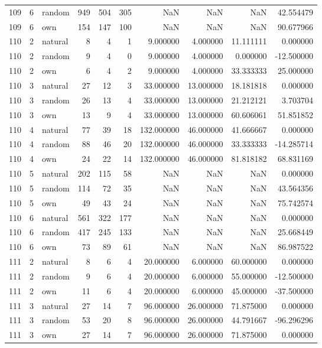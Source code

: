 \begin{table}[htbp]
\begin{tabular}{rrlrrrrrrr}
109 & 6 & random & 949 & 504 & 305 & NaN & NaN & NaN & 42.554479 \\
109 & 6 & own & 154 & 147 & 100 & NaN & NaN & NaN & 90.677966 \\
110 & 2 & natural & 8 & 4 & 1 & 9.000000 & 4.000000 & 11.111111 & 0.000000 \\
110 & 2 & random & 9 & 4 & 0 & 9.000000 & 4.000000 & 0.000000 & -12.500000 \\
110 & 2 & own & 6 & 4 & 2 & 9.000000 & 4.000000 & 33.333333 & 25.000000 \\
110 & 3 & natural & 27 & 12 & 3 & 33.000000 & 13.000000 & 18.181818 & 0.000000 \\
110 & 3 & random & 26 & 13 & 4 & 33.000000 & 13.000000 & 21.212121 & 3.703704 \\
110 & 3 & own & 13 & 9 & 4 & 33.000000 & 13.000000 & 60.606061 & 51.851852 \\
110 & 4 & natural & 77 & 39 & 18 & 132.000000 & 46.000000 & 41.666667 & 0.000000 \\
110 & 4 & random & 88 & 46 & 20 & 132.000000 & 46.000000 & 33.333333 & -14.285714 \\
110 & 4 & own & 24 & 22 & 14 & 132.000000 & 46.000000 & 81.818182 & 68.831169 \\
110 & 5 & natural & 202 & 115 & 58 & NaN & NaN & NaN & 0.000000 \\
110 & 5 & random & 114 & 72 & 35 & NaN & NaN & NaN & 43.564356 \\
110 & 5 & own & 49 & 43 & 24 & NaN & NaN & NaN & 75.742574 \\
110 & 6 & natural & 561 & 322 & 177 & NaN & NaN & NaN & 0.000000 \\
110 & 6 & random & 417 & 245 & 133 & NaN & NaN & NaN & 25.668449 \\
110 & 6 & own & 73 & 89 & 61 & NaN & NaN & NaN & 86.987522 \\
111 & 2 & natural & 8 & 6 & 4 & 20.000000 & 6.000000 & 60.000000 & 0.000000 \\
111 & 2 & random & 9 & 6 & 4 & 20.000000 & 6.000000 & 55.000000 & -12.500000 \\
111 & 2 & own & 11 & 6 & 4 & 20.000000 & 6.000000 & 45.000000 & -37.500000 \\
111 & 3 & natural & 27 & 14 & 7 & 96.000000 & 26.000000 & 71.875000 & 0.000000 \\
111 & 3 & random & 53 & 20 & 8 & 96.000000 & 26.000000 & 44.791667 & -96.296296 \\
111 & 3 & own & 27 & 14 & 7 & 96.000000 & 26.000000 & 71.875000 & 0.000000 \\

\end{tabular}
\end{table}
